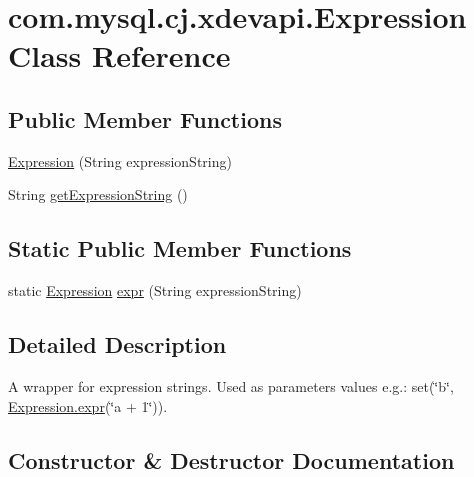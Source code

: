 \hypertarget{classcom_1_1mysql_1_1cj_1_1xdevapi_1_1_expression}{}\section{com.\+mysql.\+cj.\+xdevapi.\+Expression Class Reference}
\label{classcom_1_1mysql_1_1cj_1_1xdevapi_1_1_expression}
\subsection*{Public Member Functions}
\begin{DoxyCompactItemize}
\item 
\mbox{\hyperlink{classcom_1_1mysql_1_1cj_1_1xdevapi_1_1_expression_a1a78153ccd1e20254c80a716a587980f}{Expression}} (String expression\+String)
\item 
String \mbox{\hyperlink{classcom_1_1mysql_1_1cj_1_1xdevapi_1_1_expression_a2ca4402a9e5b44533844931a24ccda22}{get\+Expression\+String}} ()
\end{DoxyCompactItemize}
\subsection*{Static Public Member Functions}
\begin{DoxyCompactItemize}
\item 
static \mbox{\hyperlink{classcom_1_1mysql_1_1cj_1_1xdevapi_1_1_expression}{Expression}} \mbox{\hyperlink{classcom_1_1mysql_1_1cj_1_1xdevapi_1_1_expression_a6e712ed08267a9450ec8012acd30a739}{expr}} (String expression\+String)
\end{DoxyCompactItemize}


\subsection{Detailed Description}
A wrapper for expression strings. Used as parameters values e.\+g.\+: {\ttfamily set(\char`\"{}b\char`\"{}, \mbox{\hyperlink{classcom_1_1mysql_1_1cj_1_1xdevapi_1_1_expression_a6e712ed08267a9450ec8012acd30a739}{Expression.\+expr}}(\char`\"{}a + 1\char`\"{}))}. 

\subsection{Constructor \& Destructor Documentation}
\mbox{\label{classcom_1_1mysql_1_1cj_1_1xdevapi_1_1_expression_a1a78153ccd1e20254c80a716a587980f}} 
